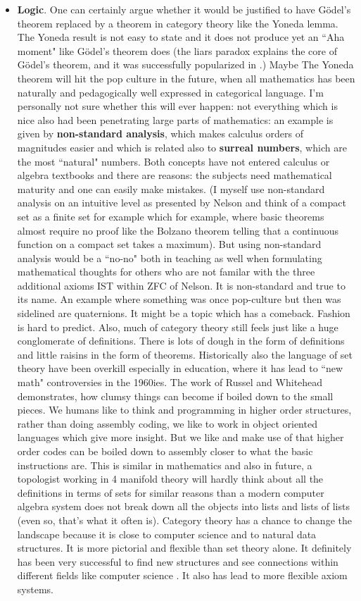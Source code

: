 \documentclass[12pt]{amsart}
\newcounter{example}    \def\example#1{ \item \fontsize{12}{15} \selectfont #1 \fontsize{12}{15} \selectfont }
\begin{document}
\begin{itemize}
\item {\bf Logic}. One can certainly argue whether it would be justified to have G\"odel's theorem replaced
by a theorem in category theory like the Yoneda lemma. The Yoneda result
is not easy to state and it does not produce yet an ``Aha moment" like G\"odel's theorem does 
(the liars paradox explains the core of G\"odel's theorem, and it was successfully popularized in
\cite{Hofstadter}.) Maybe The Yoneda theorem will hit the pop culture in the future, when all 
mathematics has been naturally and pedagogically well expressed in categorical language. 
I'm personally not sure whether this will ever happen: not everything which is nice also
had been penetrating large parts of mathematics: an example is given by {\bf non-standard analysis}, 
which makes calculus orders of magnitudes easier and which is related also to {\bf surreal numbers}, 
which are the most ``natural" numbers.  Both concepts have not entered calculus or 
algebra textbooks and there are reasons: the subjects need mathematical 
maturity and one can easily make mistakes. (I myself use non-standard analysis on an 
intuitive level as presented by Nelson \cite{Nelson77,Robert} and think of a compact 
set as a finite set for example which for example, where basic
theorems almost require no proof like the Bolzano theorem telling that a continuous 
function on a compact set takes
a maximum). But using non-standard analysis would be a ``no-no" both in 
teaching as well when formulating mathematical
thoughts for others who are not familar with the three additional axioms IST within ZFC of Nelson. 
It is non-standard and true to its name. 
An example where something was once pop-culture but then was sidelined are quaternions.
It might be a topic which has a comeback. Fashion is hard to predict. 
Also, much of category theory still feels just like a huge conglomerate of definitions. There
is lots of dough in the form of definitions and little raisins in the form of theorems. 
Historically also the language of set theory have been overkill especially in education, 
where it has lead to ``new math" controversies in the 1960ies. 
The work of Russel and Whitehead demonstrates, 
how clumsy things can become if boiled down to the small pieces. 
We humans like to think and programming in higher order structures,
rather than doing assembly coding, we like to work in object oriented languages which give more insight. 
But we like and make use of that higher order codes can be boiled down to assembly closer to what the 
basic instructions are. 
This is similar in mathematics and also in future, a topologist working in 4 manifold theory will hardly 
think about all the definitions in terms of sets for similar reasons than a modern computer algebra system
does not break down all the objects into lists and lists of lists (even so, that's what it often is).
Category theory has a chance to change the landscape because
it is close to computer science and to natural data structures. It is more pictorial and flexible
than set theory alone. It definitely has been very successful to find new structures and see connections within
different fields like computer science \cite{PierceCategory}. It also has lead to more flexible axiom systems.
\end{itemize}
\end{document}
